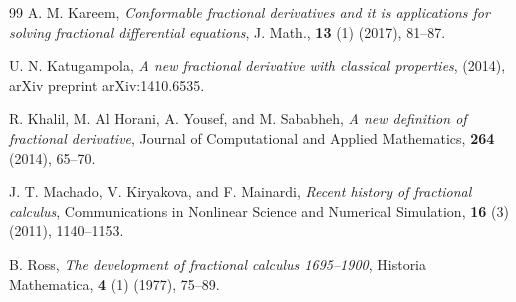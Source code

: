 \documentclass[oneside,10pt]{article}
\theoremstyle{plain}
\theoremstyle{definition}
\begin{document}
\begin{thebibliography}{99}
{\sc A. M. Kareem},
{\it Conformable fractional derivatives and it is applications for solving fractional differential equations},
J. Math., {\bf 13} (1) (2017), 81--87.

{\sc U. N. Katugampola},
{\it A new fractional derivative with classical properties},
(2014), arXiv preprint arXiv:1410.6535.

{\sc R. Khalil, M. Al Horani, A. Yousef, and M. Sababheh},
{\it A new definition of fractional derivative},
Journal of Computational and Applied Mathematics, {\bf 264} (2014), 65--70.

{\sc J. T. Machado, V. Kiryakova, and F. Mainardi},
{\it Recent history of fractional calculus},
Communications in Nonlinear Science and Numerical Simulation, {\bf 16} (3) (2011), 1140--1153.

{\sc B. Ross},
{\it The development of fractional calculus 1695--1900},
Historia Mathematica, {\bf 4} (1) (1977), 75--89.

\end{thebibliography}
\end{document}

